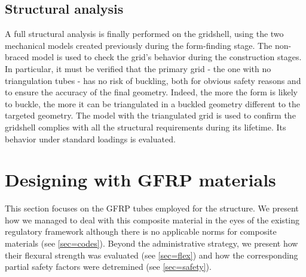 \subsection{Structural analysis}
A full structural analysis is finally performed on the gridshell, using the two mechanical models created previously during the form-finding stage.
The non-braced model is used to check the grid’s behavior during the construction stages. In particular, it must be verified that the primary grid - the one with no triangulation tubes - has no risk of buckling, both for obvious safety reasons and to ensure the accuracy of the final geometry. Indeed, the more the form is likely to buckle, the more it can be triangulated in a buckled geometry different to the targeted geometry. The model with the triangulated grid is used to confirm the gridshell complies with all the structural requirements during its lifetime. Its behavior under standard loadings is evaluated.

\section{Designing with GFRP materials}\label{sec=design_gfrp}
This section focuses on the GFRP tubes employed for the structure. We present how we managed to deal with this composite material in the eyes of the existing regulatory framework although there is no applicable norms for composite materials (see \cref{sec=codes}). Beyond the administrative strategy, we present how their flexural strength was evaluated (see \cref{sec=flex}) and how the corresponding partial safety factors were detremined (see \cref{sec=safety}).

